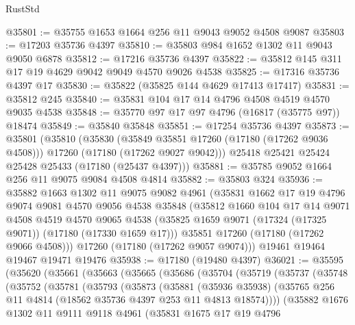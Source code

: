 \begin{lexlean}{RustStd}
\begin{coremodule}
@35801 := @35755 @1653 @1664 @256 @11 @9043 @9052 @4508 @9087
@35803 := @17203 @35736 @4397
@35810 := @35803 @984 @1652 @1302 @11 @9043 @9050 @6878
@35812 := @17216 @35736 @4397
@35822 := @35812 @145 @311 @17 @19 @4629 @9042 @9049 @4570 @9026 @4538
@35825 := @17316 @35736 @4397 @17
@35830 := @35822 (@35825 @144 @4629 @17413 @17417)
@35831 := @35812 @245
@35840 := @35831 @104 @17 @14 @4796 @4508 @4519 @4570 @9035 @4538
@35848 := @35770 @97 @17 @97 @4796 (@16817 (@35775 @97)) @18474
@35849 := @35840 @35848
@35851 := @17254 @35736 @4397
@35873 := @35801
    (@35810
      (@35830
        (@35849 @35851 @17260 (@17180 (@17262 @9036 @4508)))
        @17260
        (@17180 (@17262 @9027 @9042)))
      @25418
      @25421
      @25424
      @25428
      @25433
      (@17180 (@25437 @4397)))
@35881 := @35785 @9052 @1664 @256 @11 @9075 @9084 @4508 @4814
@35882 := @35803 @324
@35936 := @35882
    @1663
    @1302
    @11
    @9075
    @9082
    @4961
    (@35831
      @1662
      @17
      @19
      @4796
      @9074
      @9081
      @4570
      @9056
      @4538
      @35848
      (@35812
        @1660
        @104
        @17
        @14
        @9071
        @4508
        @4519
        @4570
        @9065
        @4538
        (@35825 @1659 @9071 (@17324 (@17325 @9071)) (@17180 (@17330 @1659 @17)))
        @35851
        @17260
        (@17180 (@17262 @9066 @4508)))
      @17260
      (@17180 (@17262 @9057 @9074)))
    @19461
    @19464
    @19467
    @19471
    @19476
@35938 := @17180 (@19480 @4397)
@36021 := @35595
    (@35620
      (@35661
        (@35663
          (@35665
            (@35686
              (@35704
                (@35719
                  (@35737
                    (@35748
                      (@35752
                        (@35781
                          (@35793
                            (@35873
                              (@35881
                                (@35936 @35938)
                                (@35765
                                  @256
                                  @11
                                  @4814
                                  (@18562 @35736 @4397 @253 @11 @4813 @18574))))
                            (@35882
                              @1676
                              @1302
                              @11
                              @9111
                              @9118
                              @4961
                              (@35831
                                @1675
                                @17
                                @19
                                @4796

\end{coremodule}
\end{lexlean}

